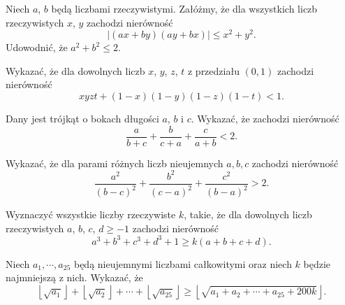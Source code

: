 \begin{problem}{1}
	Niech $a$, $b$ będą liczbami rzeczywistymi. Załóżmy, że dla wszystkich liczb rzeczywistych $x$, $y$ zachodzi nierówność
	\[
		|(ax + by)(ay + bx)| \leqslant x^2 + y^2.
	\]
	Udowodnić, że $a^2 + b^2 \leqslant 2$.
\end{problem}

\begin{problem}{2}
Wykazać, że dla dowolnych liczb $x$, $y$, $z$, $t$ z przedziału $(0, 1)$ zachodzi nierówność
\[
	xyzt + (1 - x)(1 - y)(1 - z)(1 - t) < 1.
\]
\end{problem}

\begin{problem}{3}
Dany jest trójkąt o bokach długości $a$, $b$ i $c$. Wykazać, że zachodzi nierówność
\[
	\frac{a}{b + c} + \frac{b}{c + a} + \frac{c}{a + b} < 2.
\]
\end{problem}

\begin{problem}{4}
Wykazać, że dla parami różnych liczb nieujemnych $a,b,c$ zachodzi nierówność
\[
	\frac{a^2}{(b - c)^2} + \frac{b^2}{(c - a)^2} + \frac{c^2}{(b - a)^2} > 2.
\]
\end{problem}

\begin{problem}{5}
Wyznaczyć wszystkie liczby rzeczywiste $k$, takie, że dla dowolnych liczb rzeczywistych $a$, $b$, $c$, $d \geqslant -1$ zachodzi nierówność
\[
	a^3 + b^3 + c^3 + d^3 + 1 \geqslant k(a + b + c + d).
\]
\end{problem}

\begin{problem}{6}
Niech  $ a_1,\cdots , a_{25}$ będą nieujemnymi liczbami całkowitymi oraz niech $ k$ będzie najmniejszą z nich. Wykazać, że
\[
	\left\lfloor\sqrt{a_1}\right\rfloor + \left\lfloor\sqrt{a_2}\right\rfloor + \cdots + \left\lfloor\sqrt{a_{25}}\right\rfloor \geqslant \left\lfloor\sqrt{a_1 + a_2 + \cdots + a_{25} + 200k}\right\rfloor.
\]
\end{problem}




